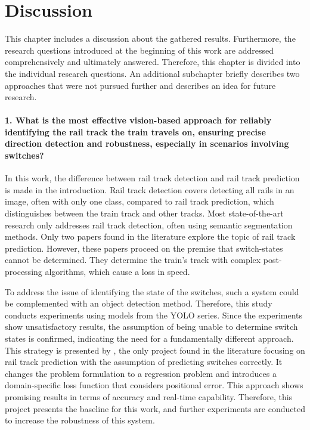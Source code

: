 \chapter{Discussion}
\label{sec:discussion}

This chapter includes a discussion about the gathered results.
Furthermore, the research questions introduced at the beginning of this work are addressed comprehensively and ultimately answered.
Therefore, this chapter is divided into the individual research questions.
An additional subchapter briefly describes two approaches that were not pursued further and describes an idea for future research.

\subsubsection{1. What is the most effective vision-based approach for reliably identifying the rail track the train travels on, ensuring precise direction detection and robustness, especially in scenarios involving switches?}

In this work, the difference between rail track detection and rail track prediction is made in the introduction.
Rail track detection covers detecting all rails in an image, often with only one class, compared to rail track prediction, which distinguishes between the train track and other tracks.
Most state-of-the-art research only addresses rail track detection, often using semantic segmentation methods.
Only two papers found in the literature explore the topic of rail track prediction.
However, these papers proceed on the premise that switch-states cannot be determined.
They determine the train's track with complex post-processing algorithms, which cause a loss in speed.

To address the issue of identifying the state of the switches, such a system could be complemented with an object detection method.
Therefore, this study conducts experiments using models from the \ac{YOLO} series.
Since the experiments show unsatisfactory results, the assumption of being unable to determine switch states is confirmed, indicating the need for a fundamentally different approach.
This strategy is presented by \cite{tepNet2024}, the only project found in the literature focusing on rail track prediction with the assumption of predicting switches correctly.
It changes the problem formulation to a regression problem and introduces a domain-specific loss function that considers positional error.
This approach shows promising results in terms of accuracy and real-time capability.
Therefore, this project presents the baseline for this work, and further experiments are conducted to increase the robustness of this system.

